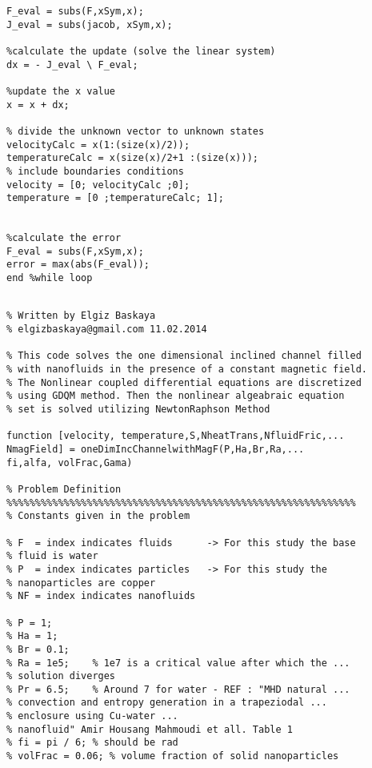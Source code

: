 \begin{lstlisting}
F_eval = subs(F,xSym,x);
J_eval = subs(jacob, xSym,x);

%calculate the update (solve the linear system)
dx = - J_eval \ F_eval;

%update the x value
x = x + dx;

% divide the unknown vector to unknown states
velocityCalc = x(1:(size(x)/2));
temperatureCalc = x(size(x)/2+1 :(size(x)));
% include boundaries conditions
velocity = [0; velocityCalc ;0];
temperature = [0 ;temperatureCalc; 1];


%calculate the error
F_eval = subs(F,xSym,x);
error = max(abs(F_eval));
end %while loop 

\end{lstlisting}


\begin{lstlisting}

% Written by Elgiz Baskaya
% elgizbaskaya@gmail.com 11.02.2014

% This code solves the one dimensional inclined channel filled 
% with nanofluids in the presence of a constant magnetic field. 
% The Nonlinear coupled differential equations are discretized 
% using GDQM method. Then the nonlinear algeabraic equation
% set is solved utilizing NewtonRaphson Method

function [velocity, temperature,S,NheatTrans,NfluidFric,...
NmagField] = oneDimIncChannelwithMagF(P,Ha,Br,Ra,...
fi,alfa, volFrac,Gama)

% Problem Definition
%%%%%%%%%%%%%%%%%%%%%%%%%%%%%%%%%%%%%%%%%%%%%%%%%%%%%%%%%%%%%
% Constants given in the problem

% F  = index indicates fluids      -> For this study the base 
% fluid is water
% P  = index indicates particles   -> For this study the 
% nanoparticles are copper 
% NF = index indicates nanofluids

% P = 1;
% Ha = 1;
% Br = 0.1;
% Ra = 1e5;    % 1e7 is a critical value after which the ...
% solution diverges 
% Pr = 6.5;    % Around 7 for water - REF : "MHD natural ...
% convection and entropy generation in a trapeziodal ...
% enclosure using Cu-water ...
% nanofluid" Amir Housang Mahmoudi et all. Table 1
% fi = pi / 6; % should be rad
% volFrac = 0.06; % volume fraction of solid nanoparticles



\end{lstlisting}
